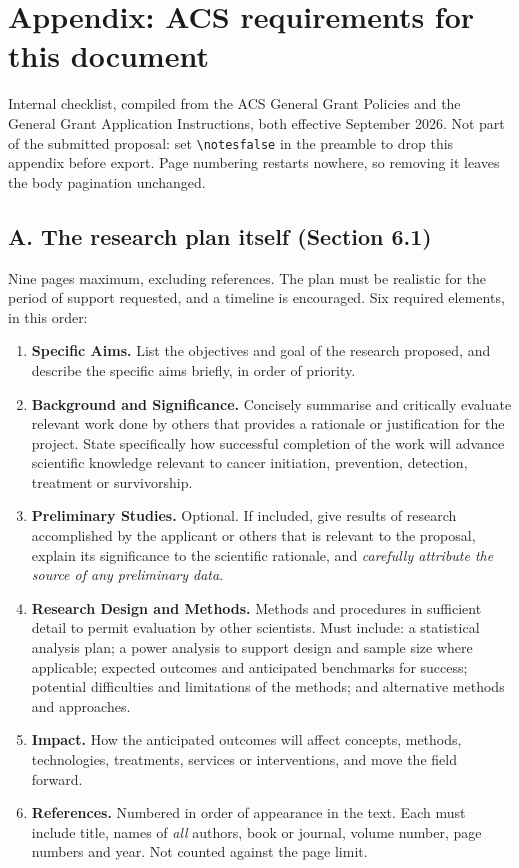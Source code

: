 \ifnotes
\clearpage
\section*{Appendix: ACS requirements for this document}
\small

Internal checklist, compiled from the ACS General Grant Policies and the General
Grant Application Instructions, both effective September 2026. Not part of the
submitted proposal: set \texttt{\textbackslash notesfalse} in the preamble to
drop this appendix before export. Page numbering restarts nowhere, so removing
it leaves the body pagination unchanged.

\subsection*{A. The research plan itself (Section 6.1)}

Nine pages maximum, excluding references. The plan must be realistic for the
period of support requested, and a timeline is encouraged. Six required
elements, in this order:

\begin{enumerate}
\item \textbf{Specific Aims.} List the objectives and goal of the research
  proposed, and describe the specific aims briefly, in order of priority.
\item \textbf{Background and Significance.} Concisely summarise and critically
  evaluate relevant work done by others that provides a rationale or
  justification for the project. State specifically how successful completion
  of the work will advance scientific knowledge relevant to cancer initiation,
  prevention, detection, treatment or survivorship.
\item \textbf{Preliminary Studies.} Optional. If included, give results of
  research accomplished by the applicant or others that is relevant to the
  proposal, explain its significance to the scientific rationale, and
  \emph{carefully attribute the source of any preliminary data}.
\item \textbf{Research Design and Methods.} Methods and procedures in
  sufficient detail to permit evaluation by other scientists. Must include: a
  statistical analysis plan; a power analysis to support design and sample size
  where applicable; expected outcomes and anticipated benchmarks for success;
  potential difficulties and limitations of the methods; and alternative
  methods and approaches.
\item \textbf{Impact.} How the anticipated outcomes will affect concepts,
  methods, technologies, treatments, services or interventions, and move the
  field forward.
\item \textbf{References.} Numbered in order of appearance in the text. Each
  must include title, names of \emph{all} authors, book or journal, volume
  number, page numbers and year. Not counted against the page limit.
\end{enumerate}

